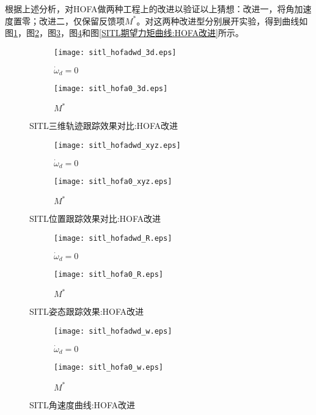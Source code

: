 根据上述分析，对HOFA做两种工程上的改进以验证以上猜想：改进一，将角加速度置零；改进二，仅保留反馈项$M^*$。对这两种改进型分别展开实验，得到曲线如图\ref{SITL三维轨迹跟踪效果对比:HOFA改进}，图\ref{SITL位置跟踪效果对比:HOFA改进}，图\ref{SITL姿态跟踪效果:HOFA改进}，图\ref{SITL角速度曲线:HOFA改进}和图\ref{SITL期望力矩曲线:HOFA改进}所示。
\begin{figure}[H]
  \centering
  \begin{subfigure}[b]{0.49\linewidth}
      \texttt{[image: sitl\_hofadwd\_3d.eps]}
      \caption{$\dot \omega_d =0$}
  \end{subfigure}
  \hfill %
  \begin{subfigure}[b]{0.49\linewidth}
      \texttt{[image: sitl\_hofa0\_3d.eps]}
      \caption{$M^*$}
  \end{subfigure}
  \caption{SITL三维轨迹跟踪效果对比:HOFA改进}
  \label{SITL三维轨迹跟踪效果对比:HOFA改进}
\end{figure}
  \begin{figure}[H]
    \centering
  \begin{subfigure}[b]{0.49\linewidth}
      \texttt{[image: sitl\_hofadwd\_xyz.eps]}
      \caption{$\dot \omega_d =0$}
  \end{subfigure}
  \hfill
  \begin{subfigure}[b]{0.49\linewidth}
      \texttt{[image: sitl\_hofa0\_xyz.eps]}
      \caption{$M^*$}
  \end{subfigure}
  \caption{SITL位置跟踪效果对比:HOFA改进}
  \label{SITL位置跟踪效果对比:HOFA改进}
\end{figure}
\begin{figure}[H]
  \centering
\begin{subfigure}[b]{0.49\linewidth}
    \texttt{[image: sitl\_hofadwd\_R.eps]}
    \caption{$\dot \omega_d =0$}
\end{subfigure}
\hfill
\begin{subfigure}[b]{0.49\linewidth}
    \texttt{[image: sitl\_hofa0\_R.eps]}
    \caption{$M^*$}
\end{subfigure}
\caption{SITL姿态跟踪效果:HOFA改进}
\label{SITL姿态跟踪效果:HOFA改进}
\end{figure}
\begin{figure}[H]
  \centering
\begin{subfigure}[b]{0.49\linewidth}
    \texttt{[image: sitl\_hofadwd\_w.eps]}
    \caption{$\dot \omega_d =0$}
\end{subfigure}
\hfill
\begin{subfigure}[b]{0.49\linewidth}
    \texttt{[image: sitl\_hofa0\_w.eps]}
    \caption{$M^*$}
\end{subfigure}
\caption{SITL角速度曲线:HOFA改进}
\label{SITL角速度曲线:HOFA改进}
\end{figure}
